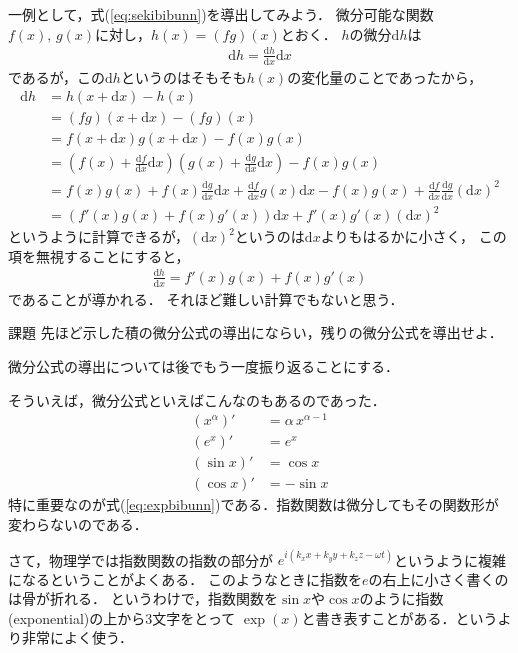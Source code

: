 一例として，式(\ref{eq:sekibibunn})を導出してみよう．
微分可能な関数$f(x), \, g(x)$に対し，$h(x)=(fg)(x)$とおく．
$h$の微分$\mathrm{d}h$は
\begin{align*}
\mathrm{d}h = \frac{\mathrm{d} h} { \mathrm{d} x } \mathrm{d} x
\end{align*}
であるが，この$\mathrm{d}h$というのはそもそも$h(x)$の変化量のことであったから，
\begin{align*}
\mathrm{d} h & = h(x + \mathrm{d} x) - h(x) \\
& = (fg)(x+\mathrm{d}x) - (fg)(x) \\
& = f(x + \mathrm{d} x ) g (x + \mathrm{d} x) - f(x)g(x) \\
& = \left( f(x) + \frac{ \mathrm{d} f } {\mathrm{d} x } \mathrm{d}x \right)
\left( g(x) + \frac{ \mathrm{d} g } {\mathrm{d} x } \mathrm{d}x \right) - f(x)g(x) \\
& = f(x)g(x) + f(x) \frac{ \mathrm{d} g } {\mathrm{d} x } \mathrm{d}x
+ \frac{ \mathrm{d} f } {\mathrm{d} x } g(x) \mathrm{d}x - f(x) g(x) 
+ \frac{ \mathrm{d} f } {\mathrm{d} x } \frac{ \mathrm{d} g } {\mathrm{d} x } ( \mathrm{d} x ) ^2 \\
& = \left( f'(x) g(x) + f(x) g'(x) \right) \mathrm{d}x
 + f'(x) g'(x) ( \mathrm{d} x ) ^2
\end{align*}
 というように計算できるが，$( \mathrm{d} x )^2$というのは$\mathrm{d} x$よりもはるかに小さく，
 この項を無視することにすると，
 \begin{align*}
 \frac{ \mathrm{d}h } {\mathrm{d}x } = f'(x) g(x) + f(x) g'(x)
 \end{align*}
 であることが導かれる．
 それほど難しい計算でもないと思う．
 \begin{itembox}[l]{課題}
先ほど示した積の微分公式の導出にならい，残りの微分公式を導出せよ．
\end{itembox}
微分公式の導出については後でもう一度振り返ることにする．

そういえば，微分公式といえばこんなのもあるのであった．
\begin{align}
(x^\alpha)' & = \alpha \, x ^{\alpha-1} \\
(e^x)' & = e^x 
\label{eq:expbibunn} \\
( \sin x )' & = \cos x 
\label{eq:sinbibunn} \\
( \cos x )' & = - \sin x 
\label{eq:cosbibunn} 
\end{align}
特に重要なのが式(\ref{eq:expbibunn})である．指数関数は微分してもその関数形が変わらないのである．

さて，物理学では指数関数の指数の部分が
$e^{i(k_x x + k_y y + k_z z - \omega t)}$というように複雑になるということがよくある．
このようなときに指数を$e$の右上に小さく書くのは骨が折れる．
というわけで，指数関数を$\sin x$や$\cos x$のように指数(exponential)の上から3文字をとって 
$\exp (x)$と書き表すことがある．というより非常によく使う．

